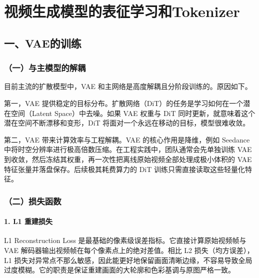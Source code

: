 \setcounter{section}{2}

\hypertarget{ux89c6ux9891ux751fux6210ux6a21ux578bux7684ux8868ux5f81ux5b66ux4e60ux548ctokenizer}{%
\section{视频生成模型的表征学习和Tokenizer}\label{ux89c6ux9891ux751fux6210ux6a21ux578bux7684ux8868ux5f81ux5b66ux4e60ux548ctokenizer}}

\hypertarget{ux4e00vaeux7684ux8badux7ec3}{%
\subsection{一、VAE的训练}\label{ux4e00vaeux7684ux8badux7ec3}}

\hypertarget{ux4e00ux4e0eux4e3bux6a21ux578bux7684ux89e3ux8026}{%
\subsubsection{（一）与主模型的解耦}\label{ux4e00ux4e0eux4e3bux6a21ux578bux7684ux89e3ux8026}}

目前主流的扩散模型中，VAE 和主网络是高度解耦且分阶段训练的。原因如下。

第一，VAE 提供稳定的目标分布。扩散网络（DiT）的任务是学习如何在一个潜在空间（Latent Space）中去噪。如果 VAE 权重与 DiT 同时更新，就意味着这个潜在空间不断漂移和变形，DiT 将面对一个永远在移动的目标，模型很难收敛。

第二，VAE 带来计算效率与工程解耦。VAE 的核心作用是降维，例如 Seedance 中将时空分辨率进行极高倍数压缩。在工程实践中，团队通常会先单独训练 VAE 到收敛，然后冻结其权重，再一次性把离线原始视频全部处理成极小体积的 VAE 特征张量并落盘保存。后续极其耗费算力的 DiT 训练只需直接读取这些轻量化特征。

\hypertarget{ux4e8cux635fux5931ux51fdux6570}{%
\subsubsection{（二）损失函数}\label{ux4e8cux635fux5931ux51fdux6570}}

\hypertarget{l1-ux91cdux5efaux635fux5931}{%
\paragraph{1. L1 重建损失}\label{l1-ux91cdux5efaux635fux5931}}

L1 Reconstruction Loss 是最基础的像素级误差指标。它直接计算原始视频帧与 VAE 解码器输出视频帧在每个像素点上的绝对差值。相比 L2 损失（均方误差），L1 损失对异常点不那么敏感，因此能更好地保留画面清晰边缘，不容易导致全局过度模糊。它的职责是保证重建画面的大轮廓和色彩基调与原图严格一致。

